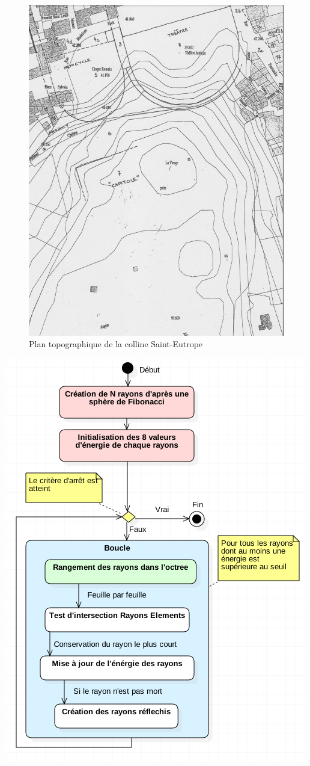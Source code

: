 \begin{figure}[!h]
	\includegraphics[width=\linewidth]{images/colline}
	\caption[Plan topographique de la colline Saint-Eutrope]{Plan topographique de la colline Saint-Eutrope \cite[p.11]{orangeTxt}}
	\label{colline} 
\end{figure} 	

\begin{figureth}
	\includegraphics[width=0.7\linewidth]{images/DiagRay2}
	\caption{Diagramme d'activité résumant le processus de création des rayons avec \gls{octree}}
	\label{DiagRay2}
\end{figureth}	

